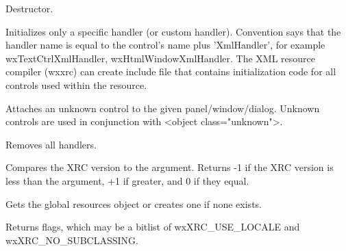\label{wxxmlresourcedtor}


Destructor.

\label{wxxmlresourceaddhandler}


Initializes only a specific handler (or custom handler). Convention says
that the handler name is equal to the control's name plus 'XmlHandler', for example
wxTextCtrlXmlHandler, wxHtmlWindowXmlHandler. The XML resource compiler
(wxxrc) can create include file that contains initialization code for
all controls used within the resource.

\label{wxxmlresourceattachunknowncontrol}


Attaches an unknown control to the given panel/window/dialog.
Unknown controls are used in conjunction with <object class="unknown">.

\label{wxxmlresourceclearhandlers}


Removes all handlers.

\label{wxxmlresourcecompareversion}


Compares the XRC version to the argument. Returns -1 if the XRC version
is less than the argument, +1 if greater, and 0 if they equal.

\label{wxxmlresourceget}


Gets the global resources object or creates one if none exists.

\label{wxxmlresourcegetflags}


Returns flags, which may be a bitlist of wxXRC\_USE\_LOCALE and wxXRC\_NO\_SUBCLASSING.

